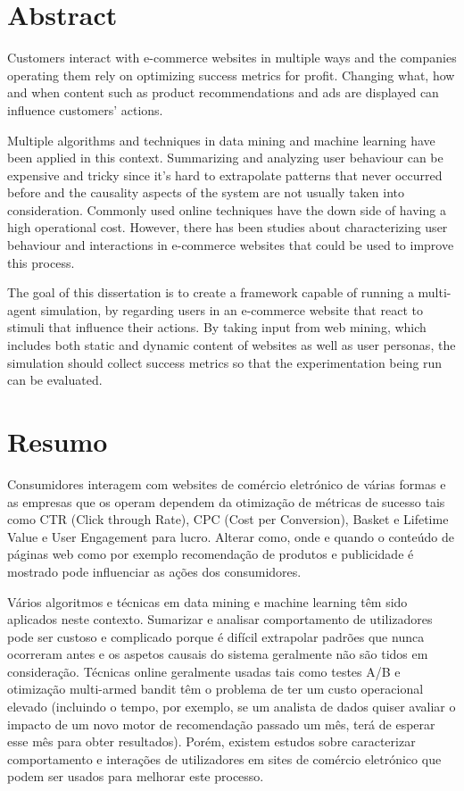 \chapter*{Abstract}


Customers interact with e-commerce websites in multiple ways and the
companies operating them rely on optimizing success metrics for profit. 
Changing what, how and when content such as product recommendations and ads are 
displayed can influence customers' actions.

Multiple algorithms and techniques in data mining and machine learning
have been applied in this context. Summarizing and analyzing user
behaviour can be expensive and tricky since it's hard to extrapolate
patterns that never occurred before and the causality aspects of the
system are not usually taken into consideration. Commonly used online
techniques have the down side of having a high operational cost. However, there 
has been studies about characterizing user behaviour and interactions in 
e-commerce websites that could be used to improve this process.

The goal of this dissertation is to create a framework capable of running
a multi-agent simulation, by regarding users in an e-commerce website that
react to stimuli that influence their actions. By taking input from web mining, 
which includes both static and dynamic content of websites as well as user 
personas, the simulation should collect success metrics so that the 
experimentation being run can be evaluated.

\chapter*{Resumo}

Consumidores interagem com websites de comércio eletrónico de várias formas e 
as empresas que os operam dependem da otimização de métricas de sucesso tais 
como CTR (Click through Rate), CPC (Cost per Conversion), Basket e Lifetime 
Value e User Engagement para lucro. Alterar como, onde e quando o conteúdo de 
páginas web como por exemplo recomendação de produtos e publicidade é mostrado 
pode influenciar as ações dos consumidores.

Vários algoritmos e técnicas em data mining e machine learning têm sido 
aplicados neste contexto. Sumarizar e analisar comportamento de utilizadores 
pode ser custoso e complicado porque é difícil extrapolar padrões que nunca 
ocorreram antes e os aspetos causais do sistema geralmente não são tidos em 
consideração. Técnicas online geralmente usadas tais como testes A/B e 
otimização multi-armed bandit têm o problema de ter um custo operacional 
elevado (incluindo o tempo, por exemplo, se um analista de dados quiser avaliar 
o impacto de um novo motor de recomendação passado um mês, terá de esperar esse 
mês para obter resultados). Porém, existem estudos sobre caracterizar 
comportamento e interações de utilizadores em sites de comércio eletrónico que 
podem ser usados para melhorar este processo.

